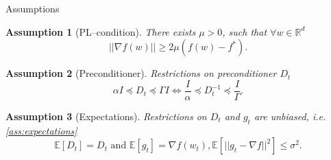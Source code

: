 \documentclass[aspectratio=169, 12pt]{beamer}
\newtheorem{assumption}{Assumption}
\begin{document}
\begin{frame}[shrink]{Assumptions}
\begin{assumption}[PL--condition]
\label{ass:plcondition}
	There exists $\mu > 0$, such that $\forall w \in \mathbb{R}^d$
    \begin{equation*}
        ||\nabla f(w) || \geq 2 \mu (f(w) - f^*).
    \end{equation*}
\end{assumption}

\begin{assumption}[Preconditioner]
Restrictions on preconditioner $D_t$
\label{ass:preconditioned}
\begin{equation*}
\alpha I \preccurlyeq D_t \preccurlyeq \Gamma I \Leftrightarrow \frac{I}{\alpha} \preccurlyeq D_t^{-1} \preccurlyeq \frac{I}{\Gamma}.
\end{equation*}
\end{assumption}

\begin{assumption}[Expectations]
Restrictions on $D_t$ and $g_t$ are unbiased, i.e.
\ref{ass:expectations}
\begin{equation*}
\mathbb{E} \left[ D_t \right] = D_t \text{ and }\mathbb{E}\left[ g_t \right] = \nabla f (w_t), \mathbb{E}\left[ ||g_t - \nabla f||^2 \right] \leq \sigma^2.
\end{equation*}
\end{assumption}
    
\end{frame}
\end{document}
